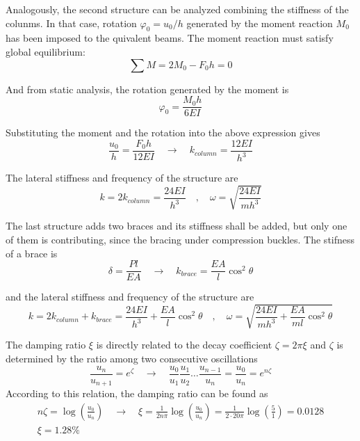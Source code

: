 \documentclass{problems}
\begin{document}
\begin{center}
\end{center}

Analogously, the second structure can be analyzed combining the stiffness of the colunms. In that case, rotation $\varphi_0 = u_0/h$ generated by the moment reaction $M_0$ has been imposed to the quivalent beams. The moment reaction must satisfy global equilibrium:
$$
\sum M = 2M_0 -F_0h = 0
$$

And from static analysis, the rotation generated by the moment is
$$
\varphi_0 = \frac{M_0h}{6EI}
$$

Substituting the moment and the rotation into the above expression gives
$$
\frac{u_0}{h} = \frac{F_0h}{12EI} \quad \rightarrow \quad k_{column} = \frac{12EI}{h^3}
$$

The lateral stiffness and frequency of the structure are
$$
k = 2k_{column} = \frac{24EI}{h^3} \quad , \quad \omega = \sqrt{\frac{24EI}{mh^3}}
$$


\begin{center}
\end{center}

The last structure adds two braces and its stiffness shall be added, but only one of them is contributing, since the bracing under compression buckles. The stifness of a brace is
$$
\delta = \frac{Pl}{EA} \quad \rightarrow \quad k_{brace} = \frac{EA}{l}\cos^2\theta
$$

and the lateral stiffness and frequency of the structure are
$$
k = 2k_{column} + k_{brace} = \frac{24EI}{h^3}+\frac{EA}{l}\cos^2\theta \quad , \quad 
\omega = \sqrt{\frac{24EI}{mh^3}+\frac{EA}{ml}\cos^2\theta}
$$





The damping ratio $\xi$ is directly related to the decay coefficient
$\zeta=2\pi\xi$ and $\zeta$ is determined by the ratio among two consecutive oscillations
$$
\frac{u_n}{u_{n+1}} = e^\zeta \quad \rightarrow \quad
\frac{u_0}{u_1} \frac{u_1}{u_2} \dots \frac{u_{n-1}}{u_n} = \frac{u_0}{u_n} = e^{n\zeta}
$$
According to this relation, the damping ratio can be found as
\begin{align*}
n\zeta = \log\left(\frac{u_0}{u_n}\right) \quad \rightarrow \quad
\xi = \frac{1}{2n\pi} \log\left(\frac{u_0}{u_n}\right) = \frac{1}{2\cdot20\pi} \log\left(\frac{5}{1}\right) = 0.0128 \\
\xi = 1.28\%
\end{align*}
\end{document}
